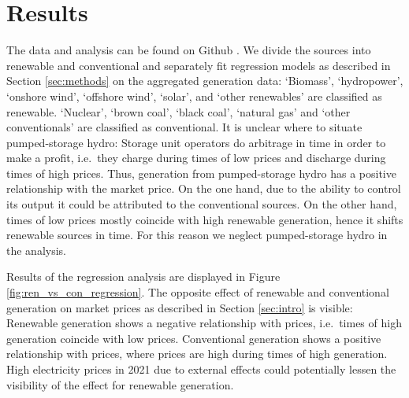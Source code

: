 \documentclass{article}
\begin{document}



\section{Results}
The data and analysis can be found on Github \citep{github_repo}.
We divide the sources into renewable and conventional and separately fit regression models as described in Section \ref{sec:methods} on the aggregated generation data:
\enquote*{Biomass}, \enquote*{hydropower}, \enquote*{onshore wind}, \enquote*{offshore wind}, \enquote*{solar}, and \enquote*{other renewables} are classified as renewable.
\enquote*{Nuclear}, \enquote*{brown coal}, \enquote*{black coal}, \enquote*{natural gas} and \enquote*{other conventionals} are classified as conventional.
It is unclear where to situate pumped-storage hydro:
Storage unit operators do arbitrage in time in order to make a profit, i.e.\ they charge during times of low prices and discharge during times of high prices.
Thus, generation from pumped-storage hydro has a positive relationship with the market price.
On the one hand, due to the ability to control its output it could be attributed to the conventional sources.
On the other hand, times of low prices mostly coincide with high renewable generation, hence it shifts renewable sources in time.
For this reason we neglect pumped-storage hydro in the analysis.

Results of the regression analysis are displayed in Figure \ref{fig:ren_vs_con_regression}.
The opposite effect of renewable and conventional generation on market prices as described in Section \ref{sec:intro} is visible:
Renewable generation shows a negative relationship with prices, i.e.\ times of high generation coincide with low prices.
Conventional generation shows a positive relationship with prices, where prices are high during times of high generation.
High electricity prices in 2021 due to external effects could potentially lessen the visibility of the effect for renewable generation.
\end{document}
